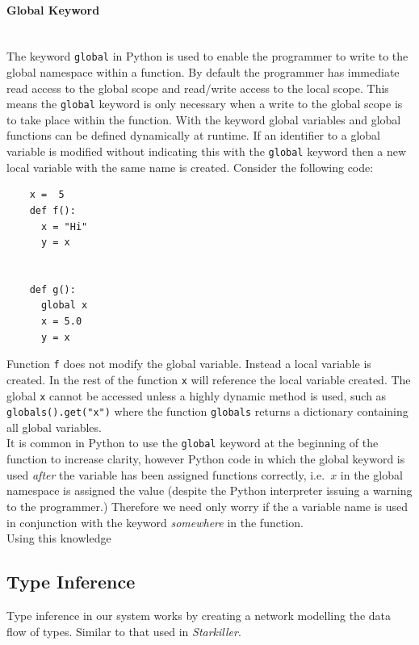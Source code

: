 \documentclass[12pt, titlepage]{article}
\begin{document}
\paragraph*{Global Keyword}\mbox{} \\
The keyword \texttt{global} in Python is used to enable the programmer to write to the global namespace within a function. By default the programmer has immediate read access to the global scope and read/write access to the local scope. This means the \texttt{global} keyword is only necessary when a write to the global scope is to take place within the function. With the keyword global variables and global functions can be defined dynamically at runtime. If an identifier to a global variable is modified without indicating this with the \texttt{global} keyword then a new local variable with the same name is created. Consider the following code:
\begin{lstlisting}
	x =  5
    def f():
      x = "Hi"
      y = x
      
      
    def g():
      global x
      x = 5.0
      y = x
\end{lstlisting}
Function \texttt{f} does not modify the global variable. Instead a local variable is created. In the rest of the function \texttt{x} will reference the local variable created. The global \texttt{x} cannot be accessed unless a highly dynamic method is used, such as \texttt{globals().get("x")} where the function \texttt{globals} returns a dictionary containing all global variables. \\
It is common in Python to use the \texttt{global} keyword at the beginning of the function to increase clarity, however Python code in which the global keyword is used \textit{after} the variable has been assigned functions correctly, i.e.\ $x$ in the global namespace is assigned the value (despite the Python interpreter issuing a warning to the programmer.) Therefore we need only worry if the a variable name is used in conjunction with the keyword \textit{somewhere} in the function. \\
Using this knowledge


\subsection{Type Inference}
Type inference in our system works by creating a network modelling the data flow of types. Similar to that used in \textit{Starkiller}. 
\end{document}
